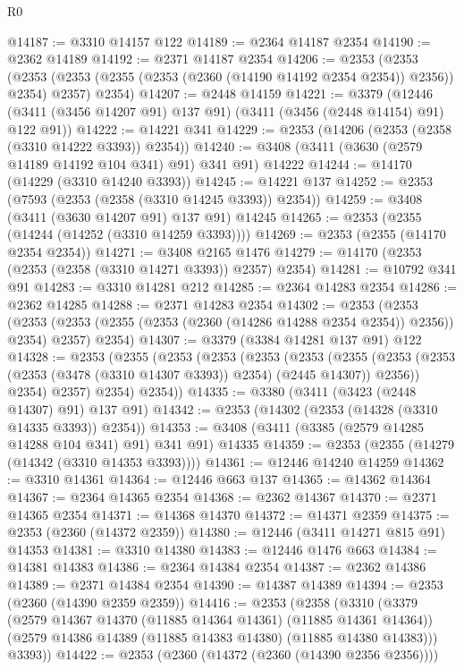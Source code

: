 \begin{lexlean}{R0}
\begin{coremodule}
@14187 := @3310 @14157 @122
@14189 := @2364 @14187 @2354
@14190 := @2362 @14189
@14192 := @2371 @14187 @2354
@14206 := @2353
    (@2353
      (@2353 (@2353 (@2355 (@2353 (@2360 (@14190 @14192 @2354 @2354)) @2356)) @2354) @2357)
      @2354)
@14207 := @2448 @14159
@14221 := @3379
    (@12446 (@3411 (@3456 @14207 @91) @137 @91) (@3411 (@3456 (@2448 @14154) @91) @122 @91))
@14222 := @14221 @341
@14229 := @2353 (@14206 (@2353 (@2358 (@3310 @14222 @3393)) @2354))
@14240 := @3408 (@3411 (@3630 (@2579 @14189 @14192 @104 @341) @91) @341 @91) @14222
@14244 := @14170 (@14229 (@3310 @14240 @3393))
@14245 := @14221 @137
@14252 := @2353 (@7593 (@2353 (@2358 (@3310 @14245 @3393)) @2354))
@14259 := @3408 (@3411 (@3630 @14207 @91) @137 @91) @14245
@14265 := @2353 (@2355 (@14244 (@14252 (@3310 @14259 @3393))))
@14269 := @2353 (@2355 (@14170 @2354 @2354))
@14271 := @3408 @2165 @1476
@14279 := @14170 (@2353 (@2353 (@2358 (@3310 @14271 @3393)) @2357) @2354)
@14281 := @10792 @341 @91
@14283 := @3310 @14281 @212
@14285 := @2364 @14283 @2354
@14286 := @2362 @14285
@14288 := @2371 @14283 @2354
@14302 := @2353
    (@2353
      (@2353 (@2353 (@2355 (@2353 (@2360 (@14286 @14288 @2354 @2354)) @2356)) @2354) @2357)
      @2354)
@14307 := @3379 (@3384 @14281 @137 @91) @122
@14328 := @2353
    (@2355
      (@2353
        (@2353
          (@2353
            (@2353
              (@2355
                (@2353 (@2353 (@2353 (@3478 (@3310 @14307 @3393)) @2354) (@2445 @14307)) @2356))
              @2354)
            @2357)
          @2354)
        @2354))
@14335 := @3380 (@3411 (@3423 (@2448 @14307) @91) @137 @91)
@14342 := @2353 (@14302 (@2353 (@14328 (@3310 @14335 @3393)) @2354))
@14353 := @3408 (@3411 (@3385 (@2579 @14285 @14288 @104 @341) @91) @341 @91) @14335
@14359 := @2353 (@2355 (@14279 (@14342 (@3310 @14353 @3393))))
@14361 := @12446 @14240 @14259
@14362 := @3310 @14361
@14364 := @12446 @663 @137
@14365 := @14362 @14364
@14367 := @2364 @14365 @2354
@14368 := @2362 @14367
@14370 := @2371 @14365 @2354
@14371 := @14368 @14370
@14372 := @14371 @2359
@14375 := @2353 (@2360 (@14372 @2359))
@14380 := @12446 (@3411 @14271 @815 @91) @14353
@14381 := @3310 @14380
@14383 := @12446 @1476 @663
@14384 := @14381 @14383
@14386 := @2364 @14384 @2354
@14387 := @2362 @14386
@14389 := @2371 @14384 @2354
@14390 := @14387 @14389
@14394 := @2353 (@2360 (@14390 @2359 @2359))
@14416 := @2353
    (@2358
      (@3310
        (@3379
          (@2579 @14367 @14370 (@11885 @14364 @14361) (@11885 @14361 @14364))
          (@2579 @14386 @14389 (@11885 @14383 @14380) (@11885 @14380 @14383)))
        @3393))
@14422 := @2353 (@2360 (@14372 (@2360 (@14390 @2356 @2356))))

\end{coremodule}
\end{lexlean}
